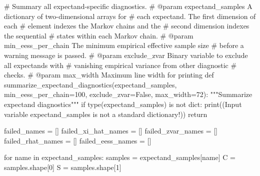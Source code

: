 \documentclass[
  letterpaper,
  DIV=11,
  numbers=noendperiod]{scrartcl}
\newenvironment{Shaded}{\begin{snugshade}}{\end{snugshade}}
\newcommand{\BuiltInTok}[1]{\textcolor[rgb]{0.00,0.23,0.31}{#1}}
\newcommand{\CommentTok}[1]{\textcolor[rgb]{0.37,0.37,0.37}{#1}}
\newcommand{\ControlFlowTok}[1]{\textcolor[rgb]{0.00,0.23,0.31}{#1}}
\newcommand{\DecValTok}[1]{\textcolor[rgb]{0.68,0.00,0.00}{#1}}
\newcommand{\KeywordTok}[1]{\textcolor[rgb]{0.00,0.23,0.31}{#1}}
\newcommand{\NormalTok}[1]{\textcolor[rgb]{0.00,0.23,0.31}{#1}}
\newcommand{\OperatorTok}[1]{\textcolor[rgb]{0.37,0.37,0.37}{#1}}
\newcommand{\StringTok}[1]{\textcolor[rgb]{0.13,0.47,0.30}{#1}}
\newcommand{\VariableTok}[1]{\textcolor[rgb]{0.07,0.07,0.07}{#1}}
\begin{document}
\begin{Shaded}
\begin{Highlighting}[]

\CommentTok{\# Summary all expectand{-}specific diagnostics.}
\CommentTok{\# @param expectand\_samples A dictionary of two{-}dimensional arrays for }
\CommentTok{\#                          each expectand.  The first dimension of each}
\CommentTok{\#                          element indexes the Markov chains and the }
\CommentTok{\#                          second dimension indexes the sequential }
\CommentTok{\#                          states within each Markov chain.}
\CommentTok{\# @param min\_eess\_per\_chain The minimum empirical effective sample size}
\CommentTok{\#                           before a warning message is passed.}
\CommentTok{\# @param exclude\_zvar Binary variable to exclude all expectands with}
\CommentTok{\#                     vanishing empirical variance from other diagnostic}
\CommentTok{\#                     checks.}
\CommentTok{\# @param max\_width Maximum line width for printing}
\KeywordTok{def}\NormalTok{ summarize\_expectand\_diagnostics(expectand\_samples,}
\NormalTok{                                    min\_eess\_per\_chain}\OperatorTok{=}\DecValTok{100}\NormalTok{,}
\NormalTok{                                    exclude\_zvar}\OperatorTok{=}\VariableTok{False}\NormalTok{,}
\NormalTok{                                    max\_width}\OperatorTok{=}\DecValTok{72}\NormalTok{):}
  \CommentTok{"""Summarize expectand diagnostics"""}
  \ControlFlowTok{if} \BuiltInTok{type}\NormalTok{(expectand\_samples) }\KeywordTok{is} \KeywordTok{not} \BuiltInTok{dict}\NormalTok{:}
    \BuiltInTok{print}\NormalTok{((}\StringTok{\textquotesingle{}Input variable \textasciigrave{}expectand\_samples\textasciigrave{} \textquotesingle{}}
           \StringTok{\textquotesingle{}is not a standard dictionary!\textquotesingle{}}\NormalTok{))}
    \ControlFlowTok{return}
  
\NormalTok{  failed\_names }\OperatorTok{=}\NormalTok{ []}
\NormalTok{  failed\_xi\_hat\_names }\OperatorTok{=}\NormalTok{ []}
\NormalTok{  failed\_zvar\_names }\OperatorTok{=}\NormalTok{ []}
\NormalTok{  failed\_rhat\_names }\OperatorTok{=}\NormalTok{ []}
\NormalTok{  failed\_eess\_names }\OperatorTok{=}\NormalTok{ []}
  
  \ControlFlowTok{for}\NormalTok{ name }\KeywordTok{in}\NormalTok{ expectand\_samples:}
\NormalTok{    samples }\OperatorTok{=}\NormalTok{ expectand\_samples[name]}
\NormalTok{    C }\OperatorTok{=}\NormalTok{ samples.shape[}\DecValTok{0}\NormalTok{]}
\NormalTok{    S }\OperatorTok{=}\NormalTok{ samples.shape[}\DecValTok{1}\NormalTok{]}
    

\end{Highlighting}
\end{Shaded}
\end{document}
